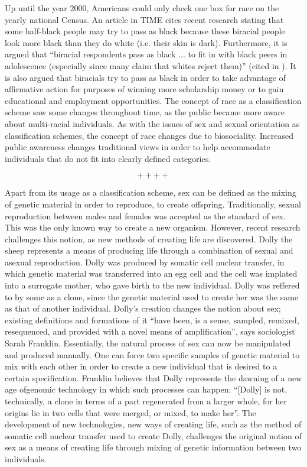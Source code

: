 Up until the year 2000, Americans could only check one box for race on the yearly national Census. \cite{census} An article in TIME cites recent research stating that some half-black people may try to pass as black because these biracial people look more black than they do white (i.e. their skin is dark). Furthermore, it is argued that “biracial respondents pass as black ... to fit in with black peers in adolescence (especially since many claim that whites reject them)” (cited in \cite{time}). It is also argued that biracials try to pass as black in order to take advantage of affirmative action for purposes of winning more scholarship money or to gain educational and employment opportunities. \cite{time} The concept of race as a classification scheme saw some changes throughout time, as the public became more aware about multi-racial individuals. As with the issues of sex and sexual orientation as classification schemes, the concept of race changes due to biosociality. Increased public awareness changes traditional views in order to help accommodate individuals that do not fit into clearly defined categories.

$$++++$$

	Apart from its usage as a classification scheme, sex can be defined as the mixing of genetic material in order to reproduce, to create offspring. Traditionally, sexual reproduction between males and females was accepted as the standard of sex. This was the only known way to create a new organism. However, recent research challenges this notion, as new methods of creating life are discovered. Dolly the sheep represents a means of producing life through a combination of sexual and asexual reproduction. Dolly was produced by somatic cell nuclear transfer, in which genetic material was transferred into an egg cell and the cell was implated into a surrogate mother, who gave birth to the new individual.  Dolly was reffered to by some as a clone, since the genetic material used to create her was the same as that of another individual.  Dolly's creation changes the notion about sex; existing definitions and formations of it “have been, is a sense, sampled, remixed, resequenced, and provided with a novel means of amplification”, says sociologist Sarah Franklin. \cite{franklin} Essentially, the natural process of sex can now be manipulated and produced manually.  One can force two specific samples of genetic material to mix with each other in order to create a new individual that is desired to a certain specification. Franklin believes that Dolly represents the dawning of a new age ofgenomic technology in which such processes can happen: “[Dolly] is not, technically, a clone in terms of a part regenerated from a larger whole, for her origins lie in two cells that were merged, or mixed, to make her”. \cite{franklin}The development of new technologies, new ways of creating life, such as the method of somatic cell nuclear transfer used to create Dolly, challenges the original notion of sex as a means of creating life through mixing of genetic information between two individuals.

